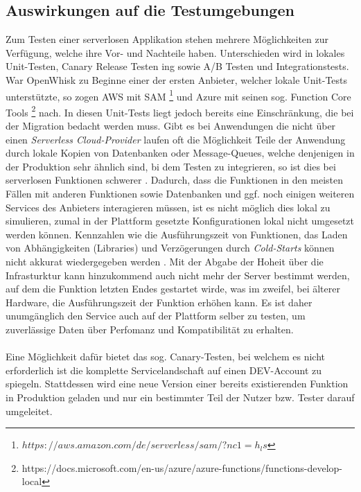 \documentclass[11pt]{article}
\begin{document}
\subsection{Auswirkungen auf die Testumgebungen}
Zum Testen einer serverlosen Applikation stehen mehrere Möglichkeiten zur Verfügung, welche ihre Vor- und Nachteile haben. Unterschieden wird in lokales Unit-Testen, Canary Release Testen ing sowie A/B Testen und Integrationstests. War OpenWhisk zu Beginne einer der ersten Anbieter, welcher lokale Unit-Tests unterstützte, so zogen AWS mit SAM \footnote{$https://aws.amazon.com/de/serverless/sam/?nc1=h_ls$} und Azure mit seinen sog. Function Core Tools \footnote{https://docs.microsoft.com/en-us/azure/azure-functions/functions-develop-local} nach. In diesen Unit-Tests liegt jedoch bereits eine Einschränkung, die bei der Migration bedacht werden muss. Gibt es bei Anwendungen die nicht über einen \textit{Serverless Cloud-Provider} laufen oft die Möglichkeit Teile der Anwendung durch lokale Kopien von Datenbanken oder Message-Queues, welche denjenigen in der Produktion sehr ähnlich sind, bi dem Testen zu integrieren, so ist dies bei serverlosen Funktionen schwerer \cite{roberts2017serverless}.  Dadurch, dass die Funktionen in den meisten Fällen mit anderen Funktionen sowie Datenbanken und ggf. noch einigen weiteren Services des Anbieters interagieren müssen, ist es nicht möglich dies lokal zu simulieren, zumal in der Plattform gesetzte Konfigurationen lokal nicht umgesetzt werden können. Kennzahlen wie die Ausführungszeit von Funktionen, das Laden von Abhängigkeiten (Libraries) und Verzögerungen durch \textit{Cold-Starts} können nicht akkurat wiedergegeben werden \cite{racicot2019quality}. Mit der Abgabe der Hoheit über die Infrasturktur kann hinzukommend auch nicht mehr der Server bestimmt werden, auf dem die Funktion letzten Endes gestartet wirde, was im zweifel, bei älterer Hardware, die Ausführungszeit der Funktion erhöhen kann. Es ist daher unumgänglich den Service auch auf der Plattform selber zu testen, um zuverlässige Daten über Perfomanz und Kompatibilität zu erhalten. \\\\
Eine Möglichkeit dafür bietet das sog. Canary-Testen, bei welchem es nicht erforderlich ist die komplette Servicelandschaft auf einen DEV-Account zu spiegeln. Stattdessen wird eine neue Version einer bereits existierenden Funktion in Produktion geladen und nur ein bestimmter Teil der Nutzer bzw. Tester darauf umgeleitet. 
\end{document}
